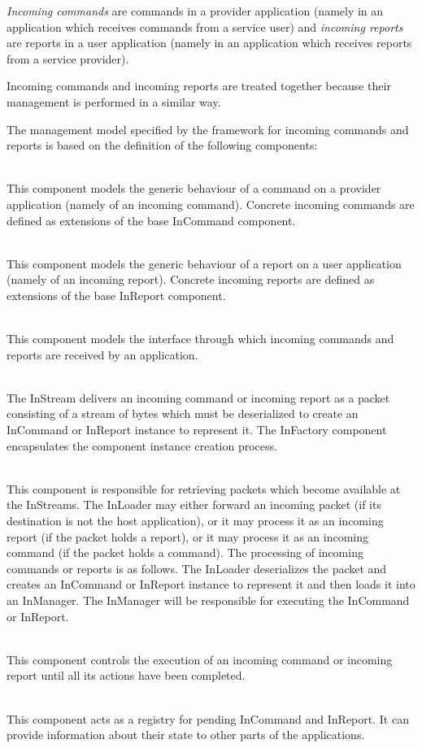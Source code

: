 \textit{Incoming commands} are commands in a provider application (namely in an application which receives commands from a service user) and \textit{incoming reports} are reports in a user application (namely in an application which receives reports from a service provider).

Incoming commands and incoming reports are treated together because their management is performed in a similar way. 

The management model specified by the framework for incoming commands and reports is based on the definition of the following components:
\begin{fw_description}
\item[InCommand]\hfill\\ 
This component models the generic behaviour of a command on a provider application (namely of an incoming command). Concrete incoming commands are defined as extensions of the base InCommand component.
\item[InReport]\hfill\\
This component models the generic behaviour of a report on a user application (namely of an incoming report). Concrete incoming reports are defined as extensions of the base InReport component.
\item[InStream]\hfill\\
This component models the interface through which incoming commands and reports are received by an application. 
\item[InFactory]\hfill\\
The InStream delivers an incoming command or incoming report as a packet consisting of a stream of bytes which must be deserialized to create an InCommand or InReport instance to represent it. The InFactory component encapsulates the component instance creation process.
\item[InLoader]\hfill\\
This component is responsible for retrieving packets which become available at the InStreams. The InLoader may either forward an incoming packet (if its destination is not the host application), or it may process it as an incoming report (if the packet holds a report), or it may process it as an incoming command (if the packet holds a command). The processing of incoming commands or reports is as follows. The InLoader deserializes the packet and creates an InCommand or InReport instance to represent it and then loads it into an InManager. The InManager will be responsible for executing the InCommand or InReport.
\item[InManager]\hfill\\
This component controls the execution of an incoming command or incoming report until all its actions have been completed.
\item[InRegistry]\hfill\\
This component acts as a registry for pending InCommand and InReport. It can provide information about their state to other parts of the applications.  
\end{fw_description}

